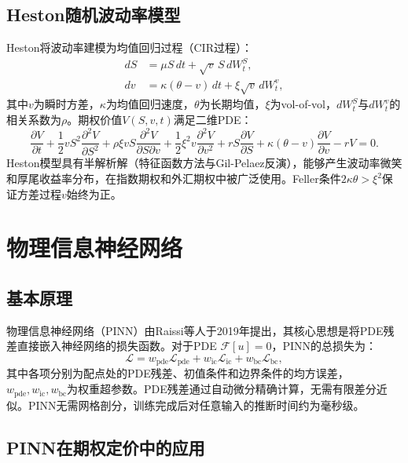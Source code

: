 \subsection{Heston随机波动率模型}

Heston\cite{heston1993closed}将波动率建模为均值回归过程（CIR过程）：
\begin{align}
  dS &= \mu S\,dt + \sqrt{v}\,S\,dW_t^S, \\
  dv &= \kappa(\theta - v)\,dt + \xi\sqrt{v}\,dW_t^v,
\end{align}
其中$v$为瞬时方差，$\kappa$为均值回归速度，$\theta$为长期均值，$\xi$为vol-of-vol，$dW_t^S$与$dW_t^v$的相关系数为$\rho$。期权价值$V(S,v,t)$满足二维PDE：
\begin{equation}\label{eq:heston}
  \frac{\partial V}{\partial t}
  + \frac{1}{2}vS^2\frac{\partial^2 V}{\partial S^2}
  + \rho\xi v S\frac{\partial^2 V}{\partial S\partial v}
  + \frac{1}{2}\xi^2 v\frac{\partial^2 V}{\partial v^2}
  + rS\frac{\partial V}{\partial S}
  + \kappa(\theta-v)\frac{\partial V}{\partial v}
  - rV = 0.
\end{equation}
Heston模型具有半解析解（特征函数方法与Gil-Pelaez反演），能够产生波动率微笑和厚尾收益率分布，在指数期权和外汇期权中被广泛使用。Feller条件$2\kappa\theta>\xi^2$保证方差过程$v$始终为正。

\section{物理信息神经网络}\label{sec:pinn}

\subsection{基本原理}

物理信息神经网络（PINN）由Raissi等人\cite{raissi2019physics}于2019年提出，其核心思想是将PDE残差直接嵌入神经网络的损失函数。对于PDE $\mathcal{F}[u]=0$，PINN的总损失为：
\begin{equation}\label{eq:pinn_loss}
  \mathcal{L} = w_{\text{pde}}\mathcal{L}_{\text{pde}}
              + w_{\text{ic}}\mathcal{L}_{\text{ic}}
              + w_{\text{bc}}\mathcal{L}_{\text{bc}},
\end{equation}
其中各项分别为配点处的PDE残差、初值条件和边界条件的均方误差，$w_{\text{pde}},w_{\text{ic}},w_{\text{bc}}$为权重超参数。PDE残差通过自动微分精确计算，无需有限差分近似。PINN无需网格剖分，训练完成后对任意输入的推断时间约为毫秒级。

\subsection{PINN在期权定价中的应用}

